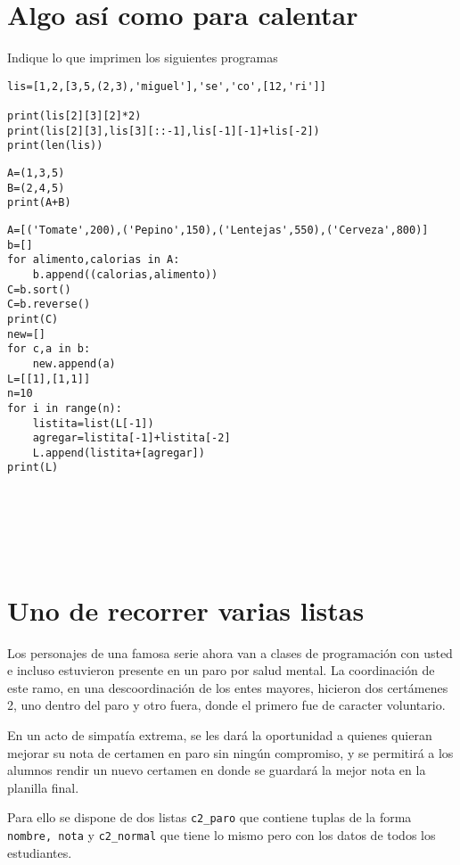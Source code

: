 \documentclass[spanish, fleqn]{scrartcl}
\begin{document}
\vspace*{.3cm}

\section{Algo así como para calentar}

Indique lo que imprimen los siguientes programas
\begin{lstlisting}[style=consola]
lis=[1,2,[3,5,(2,3),'miguel'],'se','co',[12,'ri']]

print(lis[2][3][2]*2)
print(lis[2][3],lis[3][::-1],lis[-1][-1]+lis[-2])
print(len(lis))
\end{lstlisting}
\vspace{3cm}
\begin{lstlisting}[style=consola]
A=(1,3,5)
B=(2,4,5)
print(A+B)
\end{lstlisting}
\vspace{3cm}
\begin{lstlisting}[style=consola]
A=[('Tomate',200),('Pepino',150),('Lentejas',550),('Cerveza',800)]
b=[]
for alimento,calorias in A:
    b.append((calorias,alimento))
C=b.sort()
C=b.reverse()
print(C)
new=[]
for c,a in b:
    new.append(a)
L=[[1],[1,1]]
n=10
for i in range(n):
    listita=list(L[-1])
    agregar=listita[-1]+listita[-2]
    L.append(listita+[agregar])        
print(L)
\end{lstlisting}
\\ \\ \\ \\
\newpage
\section{Uno de recorrer varias listas}

Los personajes de una famosa serie ahora van a clases de programación con usted e incluso estuvieron presente en un paro por salud mental. La coordinación de este ramo, en una descoordinación de los entes mayores, hicieron dos certámenes 2, uno dentro del paro y otro fuera, donde el primero fue de caracter voluntario.

En un acto de simpatía extrema, se les dará la oportunidad a quienes quieran mejorar su nota de certamen en paro sin ningún compromiso, y se permitirá a los alumnos rendir un nuevo certamen en donde se guardará la mejor nota en la planilla final.

Para ello se dispone de dos listas \texttt{c2\_paro} que contiene tuplas de la forma \texttt{nombre, nota} y \texttt{c2\_normal} que tiene lo mismo pero con los datos de todos los estudiantes.
\end{document}
